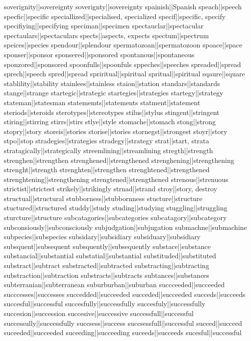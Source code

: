 soverignity||sovereignty
soverignty||sovereignty
spainish||Spanish
speach||speech
specfic||specific
speciallized||specialised, specialized
specif||specific, specify
specifiying||specifying
speciman||specimen
spectauclar||spectacular
spectaulars||spectaculars
spects||aspects, expects
spectum||spectrum
speices||species
spendour||splendour
spermatozoan||spermatozoon
spoace||space
sponser||sponsor
sponsered||sponsored
spontanous||spontaneous
sponzored||sponsored
spoonfulls||spoonfuls
sppeches||speeches
spreaded||spread
sprech||speech
spred||spread
spriritual||spiritual
spritual||spiritual
sqaure||square
stablility||stability
stainlees||stainless
staion||station
standars||standards
stange||strange
startegic||strategic
startegies||strategies
startegy||strategy
stateman||statesman
statememts||statements
statment||statement
steriods||steroids
sterotypes||stereotypes
stilus||stylus
stingent||stringent
stiring||stirring
stirrs||stirs
stlye||style
stomache||stomach
stong||strong
stopry||story
storeis||stories
storise||stories
stornegst||strongest
stoyr||story
stpo||stop
stradegies||strategies
stradegy||strategy
strat||start, strata
stratagically||strategically
streemlining||streamlining
stregth||strength
strenghen||strengthen
strenghened||strengthened
strenghening||strengthening
strenght||strength
strenghten||strengthen
strenghtened||strengthened
strenghtening||strengthening
strengtened||strengthened
strenous||strenuous
strictist||strictest
strikely||strikingly
strnad||strand
stroy||story, destroy
structual||structural
stubborness||stubbornness
stucture||structure
stuctured||structured
studdy||study
studing||studying
stuggling||struggling
sturcture||structure
subcatagories||subcategories
subcatagory||subcategory
subconsiously||subconsciously
subjudgation||subjugation
submachne||submachine
subpecies||subspecies
subsidary||subsidiary
subsiduary||subsidiary
subsquent||subsequent
subsquently||subsequently
substace||substance
substancial||substantial
substatial||substantial
substituded||substituted
substract||subtract
substracted||subtracted
substracting||subtracting
substraction||subtraction
substracts||subtracts
subtances||substances
subterranian||subterranean
suburburban||suburban
succceeded||succeeded
succcesses||successes
succedded||succeeded
succeded||succeeded
succeds||succeeds
succesful||successful
succesfully||successfully
succesfuly||successfully
succesion||succession
succesive||successive
successfull||successful
successully||successfully
succsess||success
succsessfull||successful
suceed||succeed
suceeded||succeeded
suceeding||succeeding
suceeds||succeeds
sucesful||successful
